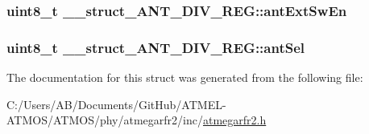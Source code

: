 \hypertarget{struct____struct___a_n_t___d_i_v___r_e_g_aefef59b03053d3afe05ebbf2487dfbbc}{
\subsubsection[{ant\-Ext\-Sw\-En}]{\setlength{\rightskip}{0pt plus 5cm}uint8\-\_\-t \-\_\-\-\_\-struct\-\_\-\-A\-N\-T\-\_\-\-D\-I\-V\-\_\-\-R\-E\-G\-::ant\-Ext\-Sw\-En}}\label{struct____struct___a_n_t___d_i_v___r_e_g_aefef59b03053d3afe05ebbf2487dfbbc}
\hypertarget{struct____struct___a_n_t___d_i_v___r_e_g_aefef79020a24daed6bc9f8b2d72ab3b6}{
\subsubsection[{ant\-Sel}]{\setlength{\rightskip}{0pt plus 5cm}uint8\-\_\-t \-\_\-\-\_\-struct\-\_\-\-A\-N\-T\-\_\-\-D\-I\-V\-\_\-\-R\-E\-G\-::ant\-Sel}}\label{struct____struct___a_n_t___d_i_v___r_e_g_aefef79020a24daed6bc9f8b2d72ab3b6}


The documentation for this struct was generated from the following file\-:\begin{DoxyCompactItemize}
\item 
C\-:/\-Users/\-A\-B/\-Documents/\-Git\-Hub/\-A\-T\-M\-E\-L-\/\-A\-T\-M\-O\-S/\-A\-T\-M\-O\-S/phy/atmegarfr2/inc/\hyperlink{atmegarfr2_8h}{atmegarfr2.\-h}\end{DoxyCompactItemize}
